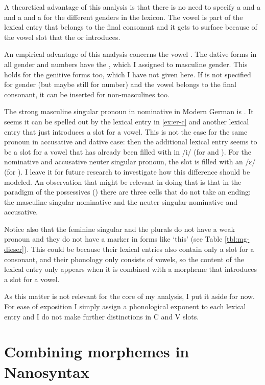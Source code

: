A theoretical advantage of this analysis is that there is no need to specify a  and a  and a  and a  for the different genders in the lexicon. The vowel is part of the lexical entry that belongs to the final consonant and it gets to surface because of the vowel slot that the  or  introduces.

An empirical advantage of this analysis concerns the vowel . The dative forms in all gender and numbers have the , which I assigned to masculine gender. This holds for the genitive forms too, which I have not given here. If  is not specified for gender (but maybe still for number) and the vowel belongs to the final consonant, it can be inserted for non-masculines too.

The strong masculine singular pronoun in nominative in Modern German is . It seems it can be spelled out by the lexical entry in \ref{ex:er-c} and another lexical entry that just introduces a slot for a vowel. This is not the case for the same pronoun in accusative and dative case: then the additional lexical entry seems to be a slot for a vowel that has already been filled with in /i/ (for  and ). For the nominative and accusative neuter singular pronoun, the slot is filled with an /ɛ/ (for ). I leave it for future research to investigate how this difference should be modeled. An observation that might be relevant in doing that is that in the paradigm of the possessives () there are three cells that do not take an ending: the masculine singular nominative and the neuter singular nominative and accusative.

Notice also that the feminine singular and the plurals do not have a weak pronoun and they do not have a marker in forms like  `this' (see Table \ref{tbl:mg-dieser}). This could be because their lexical entries also contain only a slot for a consonant, and their phonology only consists of vowels, so the content of the lexical entry only appears when it is combined with a morpheme that introduces a slot for a vowel.

As this matter is not relevant for the core of my analysis, I put it aside for now. For ease of exposition I simply assign a phonological exponent to each lexical entry and I do not make further distinctions in C and V slots.



\section{Combining morphemes in Nanosyntax}\label{sec:combining}

